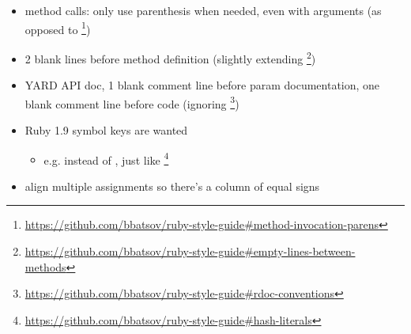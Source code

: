\begin{itemize}
	\item method calls: only use parenthesis when needed, even with
		arguments (as opposed to
		\footnote{\url{https://github.com/bbatsov/ruby-style-guide\#method-invocation-parens}})
	\item 2 blank lines before method definition (slightly extending
		\footnote{\url{https://github.com/bbatsov/ruby-style-guide\#empty-lines-between-methods}})
	\item YARD API doc, 1 blank comment line before param documentation,
		one blank comment line before code (ignoring
		\footnote{\url{https://github.com/bbatsov/ruby-style-guide\#rdoc-conventions}})
	\item Ruby 1.9 symbol keys are wanted
		\begin{itemize}
			\item e.g.  instead of , just like
			\footnote{\url{https://github.com/bbatsov/ruby-style-guide\#hash-literals}}
		\end{itemize}
	\item align multiple assignments so there's a column of equal signs
\end{itemize}
